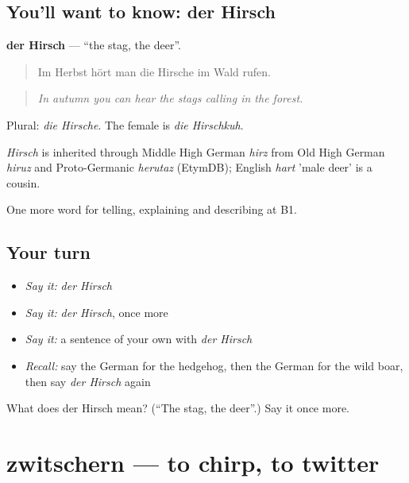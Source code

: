 \subsection*{You'll want to know: der Hirsch}
\textbf{der Hirsch} — \textquotedblleft{}the stag, the deer\textquotedblright{}.

\begin{quote}
Im Herbst hört man die Hirsche im Wald rufen.
\end{quote}

\begin{quote}
\emph{In autumn you can hear the stags calling in the forest.}
\end{quote}

Plural: \emph{die Hirsche}. The female is \emph{die Hirschkuh}.

\begin{cousinweb}
\emph{Hirsch} is inherited through Middle High German \emph{hirz} from Old High German \emph{hiruz} and Proto-Germanic \emph{herutaz} (EtymDB); English \emph{hart} 'male deer' is a cousin.
\end{cousinweb}

\begin{grammarlens}[title={What you've built}]
One more word for telling, explaining and describing at B1.
\end{grammarlens}

\subsection*{Your turn}
\begin{itemize}
\raggedright
  \item \emph{Say it:} \emph{der Hirsch}
  \item \emph{Say it:} \emph{der Hirsch}, once more
  \item \emph{Say it:} a sentence of your own with \emph{der Hirsch}
  \item \emph{Recall:} say the German for the hedgehog, then the German for the wild boar, then say \emph{der Hirsch} again
\end{itemize}

\begin{tcolorbox}[breakable,colback=teal!4,colframe=teal!35!black,title={Before you move on}]
What does der Hirsch mean? (\textquotedblleft{}The stag, the deer\textquotedblright{}.) Say it once more.
\end{tcolorbox}
\section[zwitschern]{zwitschern — to chirp, to twitter}

